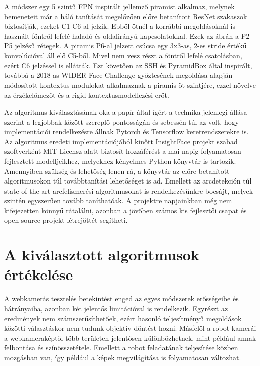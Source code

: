 A módszer egy 5 szintű FPN inspirált jellemző piramist alkalmaz, melynek bemeneteit már a háló tanítását megelőzően előre betanított ResNet szakaszok biztosítják, ezeket C1-C6-al jelzik.
Ebből ötnél a korrábbi megoldásoknál \cite{lin_feature_2017,lin_focal_2018} is használt föntről lefelé haladó és oldalirányú kapcsolatokkal. Ezek az ábrán a P2-P5 jelzésű rétegek. A piramis P6-al jelzett csúcsa egy 3x3-as, 2-es stride értékű konvolúcióval áll elő C5-ből. Mivel nem vesz részt a föntről lefelé csatolásban, ezért C6 jelzéssel is ellátták. Ezt követően az SSH\cite{najibi_ssh_2017} és PyramidBox\cite{tang_pyramidbox_2018} által inspirált, továbbá a 2018-as WIDER Face Challenge győztesének megoldása\cite{loy_wider_2019} alapján módosított kontextus modulokat alkalmaznak a piramis öt szintjére, ezzel növelve az érzékelőmezőt és a rigid kontextusmodellezési erőt.

Az algoritmus kiválasztásának oka a papír által ígért a technika jelenlegi állása szerint a legjobbak között szereplő pontosságán és sebessén túl az volt, hogy implementációi rendelkezésre állnak Pytorch\cite{biubug6_retinaface-pytorch_2021} és Tensorflow\cite{stan_btd_retinaface-tf2_2021} keretrendszerekre is. Az algoritmus eredeti implementációjából kinőtt InsightFace\cite{noauthor_insightface_nodate} projekt szabad szoftverként MIT Licensz alatt biztosít hozzáférést \cite{noauthor_insightface-github_2021} a mai napig folyamatosan fejlesztett modelljeikhez, melyekhez kényelmes Python könyvtár is tartozik. Amennyiben szükség és lehetőség lenen rá, a könyvtár az előre betanított algoritmusokon túl továbbtanítási lehetőséget is ad. Emellett az arcdetekción túl state-of-the art arcfelismerési algoritmusokat is rendelkezésünkre bocsájt, melyek szintén egyszerűen tovább taníthatóak. A projektre napjainkban még nem kifejezetten könnyű rátalálni, azonban a jövőben számos kis fejlesztői csapat és open source projekt létrejöttét segítheti.

\chapter{A kiválasztott algoritmusok értékelése}
A webkamerás tesztelés betekintést enged az egyes módszerek erősségeibe és hátrányaiba, azonban két jelentős limitációval is rendelkezik. Egyrészt az eredmények nem számszerűsíthetőek, ezért hasonló teljesítményű megoldások közötti választáskor nem tudunk objektív döntést hozni. Másfelől a robot kamerái a webkameraképtől több területen jelentősen különbözhetnek, mint például annak felbontása és színösszetétele. Emellett a robot feladatának teljesítése közben mozgásban van, így például a képek megvilágítása is folyamatosan változhat.

